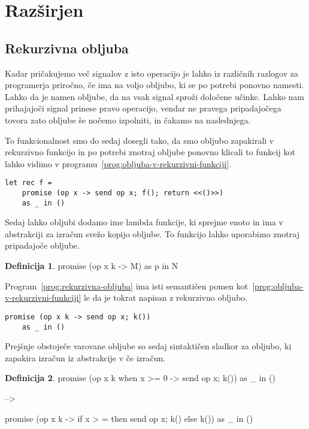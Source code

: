 \documentclass[12pt,a4paper,twoside]{article}
\newcommand\mP[1]{\todo[inline,color=red]{#1 -MP}}	%
\theoremstyle{definition} %
\newtheorem{definicija}{Definicija}[section]
\theoremstyle{plain} %
\numberwithin{equation}{section}  %
\begin{document}
\section{Razširjen \lae{}}\label{sec:razsirjen-lae}



\subsection{Rekurzivna obljuba}


\mP{Tole še ni za oddati.}

Kadar pričakujemo več signalov z isto operacijo je lahko iz različnih razlogov za programerja priročno, če ima na voljo obljubo, ki se po potrebi ponovno namesti. Lahko da je namen obljube, da na vsak signal sproži določene učinke. Lahko nam prihajajoči signal prinese pravo operacijo, vendar ne pravega pripadajočega tovora zato obljube še nočemo izpolniti, in čakamo na naslednjega.

To funkcionalnost smo do sedaj dosegli tako, da smo obljubo zapakirali v rekurzivno funkcijo in po potrebi znotraj obljube ponovno klicali to funkcij kot lahko vidimo v programu~\ref{prog:obljuba-v-rekurzivni-funkciji}.


\begin{lstlisting}[caption={Obljuba v rekurzivni funkciji.},label={prog:obljuba-v-rekurzivni-funkciji}]
	let rec f =
	promise (op x -> send op x; f(); return <<()>>) 
	as _ in ()
\end{lstlisting}



Sedaj lahko obljubi dodamo ime lambda funkcije, ki sprejme enoto in ima v abstrakciji za izračun svežo kopijo obljube. To funkcijo lahko uporabimo znotraj pripadajoče obljube.

\begin{definicija}
	promise (op x k -> M) as p in N
\end{definicija}

Program~\ref{prog:rekurzivna-obljuba} ima isti semantičen pomen kot~\ref{prog:obljuba-v-rekurzivni-funkciji} le da je tokrat napisan z rekurzivno obljubo.
\begin{lstlisting}[caption={Rekurzivna obljuba.},label={prog:rekurzivna-obljuba}]
	promise (op x k -> send op x; k())
	as _ in ()
\end{lstlisting}

Prejšnje obstoječe varovane obljube so sedaj sintaktičen sladkor za obljubo, ki zapakira izračun iz abstrakcije v če izračun.
\begin{definicija}

	promise (op x k when x >= 0 -> send op x; k())
	as \_ in ()
	
	-->
	
	promise (op x k -> if x > = then send op x; k() else k())
	as \_ in ()
\end{definicija}
\end{document}

